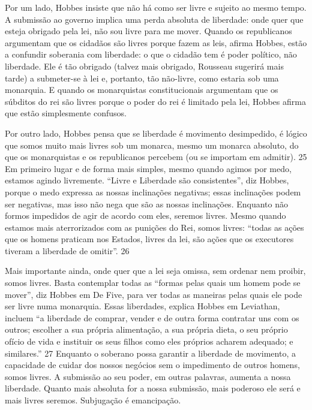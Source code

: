 \par
 
Por um lado, Hobbes insiste que não há como ser livre e sujeito ao mesmo tempo. A submissão ao governo implica uma perda absoluta de liberdade: onde quer que esteja obrigado pela lei, não sou livre para me mover. Quando os republicanos argumentam que os cidadãos são livres porque fazem as leis, afirma Hobbes, estão a confundir soberania com liberdade: o que o cidadão tem é poder político, não liberdade. Ele é tão obrigado (talvez mais obrigado, Rousseau sugerirá mais tarde) a submeter-se à lei e, portanto, tão não-livre, como estaria sob uma monarquia. E quando os monarquistas constitucionais argumentam que os súbditos do rei são livres porque o poder do rei é limitado pela lei, Hobbes afirma que estão simplesmente confusos.
 
\par
 
Por outro lado, Hobbes pensa que se liberdade é movimento desimpedido, é lógico que somos muito mais livres sob um monarca, mesmo um monarca absoluto, do que os monarquistas e os republicanos percebem (ou se importam em admitir).
 {\color{blue} 25}  
Em primeiro lugar e de forma mais simples, mesmo quando agimos por medo, estamos agindo livremente. “Livre e Liberdade são consistentes”, diz Hobbes, porque o medo expressa as nossas inclinações negativas; essas inclinações podem ser negativas, mas isso não nega que são as nossas inclinações. Enquanto não formos impedidos de agir de acordo com eles, seremos livres. Mesmo quando estamos mais aterrorizados com as punições do Rei, somos livres: “todas as ações que os homens praticam nos Estados, livres da lei, são ações que os executores tiveram a liberdade de omitir”.
 {\color{blue} 26}  

 
\par
 
Mais importante ainda, onde quer que a lei seja omissa, sem ordenar nem proibir, somos livres. Basta contemplar todas as “formas pelas quais um homem pode se mover”, diz Hobbes em De Five, para ver todas as maneiras pelas quais ele pode ser livre numa monarquia. Essas liberdades, explica Hobbes em Leviathan, incluem “a liberdade de comprar, vender e de outra forma contratar uns com os outros; escolher a sua própria alimentação, a sua própria dieta, o seu próprio ofício de vida e instituir os seus filhos como eles próprios acharem adequado; e similares.”
 {\color{blue} 27}  
Enquanto o soberano possa garantir a liberdade de movimento, a capacidade de cuidar dos nossos negócios sem o impedimento de outros homens, somos livres. A submissão ao seu poder, em outras palavras, aumenta a nossa liberdade. Quanto mais absoluta for a nossa submissão, mais poderoso ele será e mais livres seremos. Subjugação é emancipação.
 
